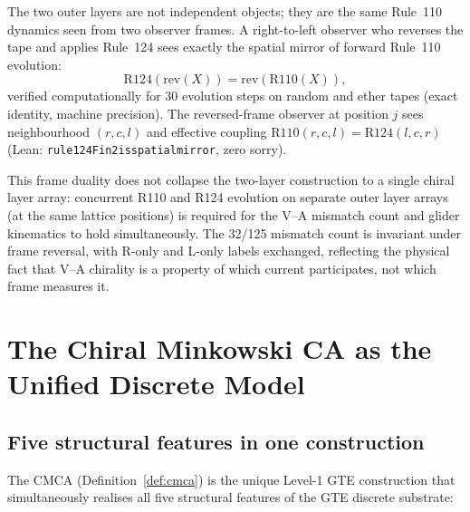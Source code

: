 \documentclass[11pt]{article}
\theoremstyle{remark}
\newcommand{\lean}[1]{%
  \penalty-100
  \begingroup\def\_{\textunderscore\allowbreak}\texttt{#1}\endgroup}
\begin{document}
The two outer layers are not independent objects; they are the same Rule~110
dynamics seen from two observer frames.  A right-to-left observer who reverses
the tape and applies Rule~124 sees exactly the spatial mirror of forward
Rule~110 evolution:
\begin{equation}
  \label{eq:frame_duality}
  \mathrm{R124}(\mathrm{rev}(X)) = \mathrm{rev}(\mathrm{R110}(X)),
\end{equation}
verified computationally for 30 evolution steps on random and ether tapes
(exact identity, machine precision).  The reversed-frame observer at position $j$
sees neighbourhood $(r,c,l)$ and effective coupling
$\mathrm{R110}(r,c,l) = \mathrm{R124}(l,c,r)$ (Lean:
\lean{rule124Fin2\_is\_spatial\_mirror}, zero sorry).

This frame duality does not collapse the two-layer construction to a single
chiral layer array: concurrent R110 and R124 evolution on separate outer
layer arrays (at the same lattice positions) is required for the
V--A mismatch count and glider kinematics to hold simultaneously.  The 32/125
mismatch count is invariant under frame reversal, with R-only and L-only labels
exchanged, reflecting the physical fact that V--A chirality is a property of
which current participates, not which frame measures it.

\section{The Chiral Minkowski CA as the Unified Discrete Model}
\label{sec:cmca_unified}

\subsection{Five structural features in one construction}
\label{ssec:five_features}

The CMCA (Definition~\ref{def:cmca}) is the unique Level-1 GTE construction
that simultaneously realises all five structural features of the GTE discrete
substrate:
\end{document}
